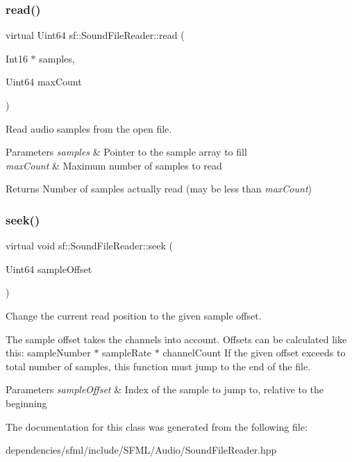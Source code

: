\subsubsection{\texorpdfstring{read()}{read()}}
{\footnotesize\ttfamily virtual Uint64 sf\+::\+Sound\+File\+Reader\+::read (\begin{DoxyParamCaption}\item[{Int16 $\ast$}]{samples,  }\item[{Uint64}]{max\+Count }\end{DoxyParamCaption})\hspace{0.3cm}{\ttfamily [pure virtual]}}



Read audio samples from the open file. 


\begin{DoxyParams}{Parameters}
{\em samples} & Pointer to the sample array to fill \\
\hline
{\em max\+Count} & Maximum number of samples to read\\
\hline
\end{DoxyParams}
\begin{DoxyReturn}{Returns}
Number of samples actually read (may be less than {\itshape max\+Count}) 
\end{DoxyReturn}
\mbox{\label{classsf_1_1_sound_file_reader_a1e18ade5ffe882bdfa20a2ebe7e2b015}} 
\subsubsection{\texorpdfstring{seek()}{seek()}}
{\footnotesize\ttfamily virtual void sf\+::\+Sound\+File\+Reader\+::seek (\begin{DoxyParamCaption}\item[{Uint64}]{sample\+Offset }\end{DoxyParamCaption})\hspace{0.3cm}{\ttfamily [pure virtual]}}



Change the current read position to the given sample offset. 

The sample offset takes the channels into account. Offsets can be calculated like this\+: {\ttfamily sample\+Number $\ast$ sample\+Rate $\ast$ channel\+Count} If the given offset exceeds to total number of samples, this function must jump to the end of the file.


\begin{DoxyParams}{Parameters}
{\em sample\+Offset} & Index of the sample to jump to, relative to the beginning \\
\hline
\end{DoxyParams}


The documentation for this class was generated from the following file\+:\begin{DoxyCompactItemize}
\item 
dependencies/sfml/include/\+S\+F\+M\+L/\+Audio/Sound\+File\+Reader.\+hpp\end{DoxyCompactItemize}
